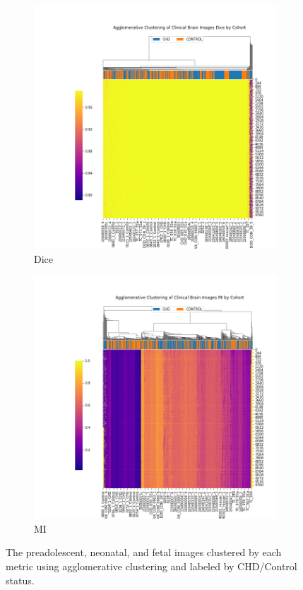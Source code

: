\begin{figure}[t]
	\begin{subfigure}{0.49\textwidth}
		\centering
		\includegraphics[width=1.0\textwidth]{6/figures/cohort-bold-dice-sns-agg.png}
		\caption{Dice}
	\end{subfigure}
	\begin{subfigure}{0.49\textwidth}
		\centering
		\includegraphics[width=1.0\textwidth]{6/figures/cohort-bold-mi-sns-agg.png}
		\caption{MI}
	\end{subfigure}
\caption{The preadolescent, neonatal, and fetal images clustered by each metric using agglomerative clustering and labeled by CHD/Control status.}
\label{fig:mochar-cohorts-sns-agg}
\end{figure}